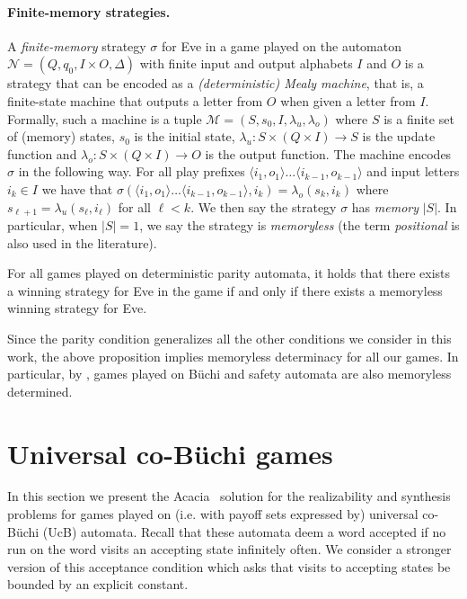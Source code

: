 \documentclass[runningheads,a4paper,draft]{llncs}
\newcommand{\eve}{Eve\xspace}
\newcommand{\calN}{\mathcal{N}}
\newcommand{\calM}{\mathcal{M}}
\begin{document}
\paragraph{Finite-memory strategies.}
A \emph{finite-memory} strategy $\sigma$ for \eve in a game played on the
automaton $\calN = (Q,q_0,I \times O,\Delta)$ with finite input and output
alphabets $I$ and $O$ is a strategy that can be encoded as a
\emph{(deterministic) Mealy machine}, that is, a finite-state machine that
outputs a letter from \(O\) when given a letter from \(I\).  Formally, such a
machine is a tuple $\calM = (S,s_0,I, \lambda_u,\lambda_o)$ where $S$ is a
finite set of (memory) states, $s_0$ is the initial state,
$\lambda_u\colon S \times (Q \times I) \to S$ is the update function and
$\lambda_o\colon S \times (Q \times I) \to O$ is the output function. The
machine encodes $\sigma$ in the following way. For all play prefixes
$\langle i_1, o_1\rangle \dots \langle i_{k-1}, o_{k-1} \rangle$ and input
letters $i_k \in I$ we have that
$\sigma(\langle i_1, o_1\rangle \dots \langle i_{k-1}, o_{k-1} \rangle, i_k) =
\lambda_o(s_k,i_k)$ where $s_{\ell + 1} = \lambda_u(s_\ell,i_\ell)$ for all
$\ell < k$. We then say the strategy $\sigma$ has \emph{memory} $|S|$. In
particular, when $|S| = 1$, we say the strategy is \emph{memoryless} (the term
\emph{positional} is also used in the literature).

\begin{proposition}
  \label{prop:det}%
  For all games played on deterministic parity automata, it holds that there
  exists a winning strategy for \eve in the game if and only if there exists a
  memoryless winning strategy for \eve.
\end{proposition}
Since the parity condition generalizes all the other conditions we consider in
this work, the above proposition implies memoryless determinacy for all our
games.  In particular, by , games played on Büchi and safety
automata are also memoryless determined.

\section{Universal co-B\"uchi games}
In this section we present the Acacia~\cite{acacia} solution for the
realizability and synthesis problems for games played on (i.e. with payoff sets
expressed by) universal co-B\"uchi (UcB) automata.  Recall that these automata
deem a word accepted if no run on the word visits an accepting state infinitely
often.  We consider a stronger version of this acceptance condition which asks
that visits to accepting states be bounded by an explicit constant.
\end{document}
